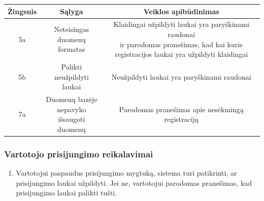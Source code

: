 \documentclass[12pt]{article}
\begin{document}
		\begin{center}
		\begin{tabular}{ | c | c | c | }
			\hline
			Žingsnis & Sąlyga                                     & Veiklos apibūdinimas \\ \hline
			5a       & \makecell{Neteisingas \\ duomenų formatas} & \makecell{Klaidingai užpildyti laukai yra paryškinami raudonai \\ ir parodomas pranešimas, kad kai kurie \\ registracijos laukai yra užpildyti klaidingai} \\ \hline
			5b       & \makecell{Palikti \\ neužpildyti laukai}   & Neužpildyti laukai yra paryškinami raudonai \\ \hline
			7a       & \makecell{Duomenų bazėje \\ nepavyko išsaugoti \\ duomenų} & Parodomas pranešimas apie nesėkmingą registraciją \\ \hline
		\end{tabular}
		\end{center}
	\pagebreak
	
	\subsubsection{Vartotojo prisijungimo reikalavimai}
	\begin{enumerate}[labelindent=10pt,leftmargin=2.2cm]
		\item Vartotojui paspaudus prisijungimo mygtuką, sistema turi patikrinti, ar prisijungimo laukai užpildyti. Jei ne, vartotojui parodomas pranešimas, kad prisijungimo laukai palikti tušti.
	\end{enumerate}
		
\end{document}
